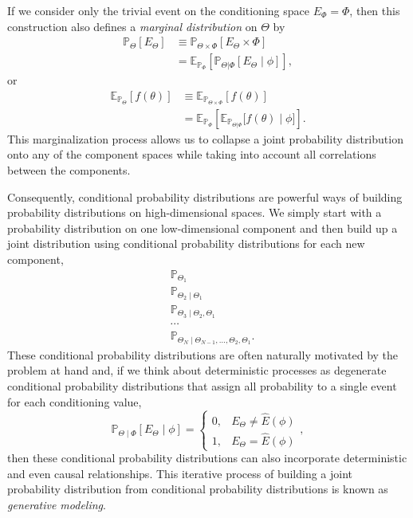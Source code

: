 \documentclass[11pt, oneside]{article}
\newcommand{\PP}{ \mathbb{P} }
\newcommand{\EE}{ \mathbb{E} }
\begin{document}
If we consider only the trivial event on the conditioning space $E_{\Phi} 
= \Phi$, then this construction also defines a  \emph{marginal distribution} 
on $\Theta$ by
%
\begin{align*}
\PP_{\Theta} \! \left[ E_{\Theta} \right]
&\equiv
\PP_{\Theta \times \Phi} \! \left[ E_{\Theta} \times \Phi \right] \\
&=
\mathbb{E}_{\PP_{\Phi}} \! \left[  
\PP_{\Theta|\Phi} \! \left[ E_{\Theta} \mid \phi \right]
\right],
\end{align*}
or
%
\begin{align*}
\EE_{\PP_{\Theta}} \! \left[ f \! \left( \theta \right) \right]
&\equiv
\EE_{\PP_{\Theta \times \Phi}} \! \left[ f \! \left( \theta \right) \right] \\
&=
\mathbb{E}_{\PP_{\Phi}} \! \left[  
\EE_{\PP_{\Theta|\Phi}} \! \Big[ 
f \! \left( \theta \right) \mid \phi 
\Big]
\right].
\end{align*}
%
This marginalization process allows us to collapse a joint probability 
distribution onto any of the component spaces while taking into account 
all correlations between the components.

Consequently, conditional probability distributions are powerful ways of
building probability distributions on high-dimensional spaces.  We simply 
start with a probability distribution on one low-dimensional component and 
then build up a joint distribution using conditional probability distributions 
for each new component,
%
\begin{align*}
& \PP_{\Theta_{1}} \\
& \PP_{\Theta_{2} \mid \Theta_{1}} \\
& \PP_{\Theta_{3} \mid \Theta_{2}, \Theta_{1}} \\
& \cdots \\
& \PP_{\Theta_{N} \mid \Theta_{N - 1}, \ldots, \Theta_{2}, \Theta_{1}}.
\end{align*}
%
These conditional probability distributions are often naturally motivated by
the problem at hand and, if we think about deterministic processes as 
degenerate conditional probability distributions that assign all probability 
to a single event for each conditioning value,
%
\begin{equation*}
\PP_{\Theta \mid \Phi} \! \left[ E_{\Theta} \mid \phi \right]
= 
\left\{
\begin{array}{rr}
0, & E_{\Theta} \ne \hat{E} \! \left( \phi \right) \\
1, & E_{\Theta} = \hat{E} \! \left( \phi \right)
\end{array}
\right.,
\end{equation*}
%
then these conditional probability distributions can also incorporate 
deterministic and even causal relationships.  This iterative process 
of building a joint probability distribution from conditional probability 
distributions is known as \emph{generative modeling}.
\end{document}
